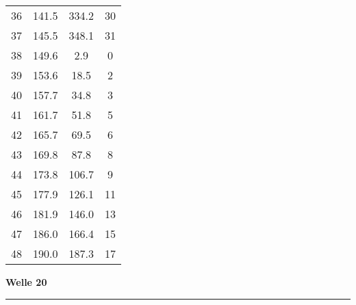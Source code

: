 \documentclass[10pt, a4paper]{article}
\begin{document}
\begin{center}
\begin{tabular}{c|c|c|c}
		36 & 141.5 & 334.2 & 30 \\
		37 & 145.5 & 348.1 & 31 \\
		38 & 149.6 & 2.9 & 0 \\
		39 & 153.6 & 18.5 & 2 \\
		40 & 157.7 & 34.8 & 3 \\
		41 & 161.7 & 51.8 & 5 \\
		42 & 165.7 & 69.5 & 6 \\
		43 & 169.8 & 87.8 & 8 \\
		44 & 173.8 & 106.7 & 9 \\
		45 & 177.9 & 126.1 & 11 \\
		46 & 181.9 & 146.0 & 13 \\
		47 & 186.0 & 166.4 & 15 \\
		48 & 190.0 & 187.3 & 17 \\
	\end{tabular}
\end{center}
\newpage
\centerline{{\bf Welle 20} }
\rule{1.0\textwidth}{0.5mm}
\end{document}
